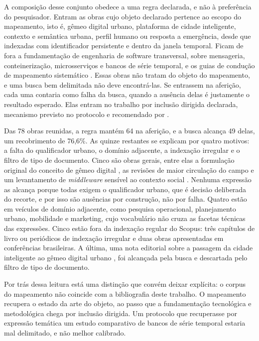 A composição desse conjunto obedece a uma regra declarada, e não à preferência do pesquisador. Entram as obras cujo objeto declarado pertence ao escopo do mapeamento, isto é, gêmeo digital urbano, plataforma de cidade inteligente, contexto e semântica urbana, perfil humano ou resposta a emergência, desde que indexadas com identificador persistente e dentro da janela temporal. Ficam de fora a fundamentação de engenharia de software transversal, sobre mensageria, conteinerização, microsserviços e bancos de série temporal, e os guias de condução de mapeamento sistemático \cite{petersen2015guidelines,barn2017conducting}. Essas obras não tratam do objeto do mapeamento, e uma busca bem delimitada não deve encontrá-las. Se entrassem na aferição, cada uma contaria como falha da busca, quando a ausência delas é justamente o resultado esperado. Elas entram no trabalho por inclusão dirigida declarada, mecanismo previsto no protocolo e recomendado por .

Das 78 obras reunidas, a regra mantém 64 na aferição, e a busca alcança 49 delas, um recobrimento de 76,6\%. As quinze restantes se explicam por quatro motivos: a falta do qualificador urbano, o domínio adjacente, a indexação irregular e o filtro de tipo de documento. Cinco são obras gerais, entre elas a formulação original do conceito de gêmeo digital \cite{grieves2016digital}, as revisões de maior circulação do campo \cite{barricelli2019survey,rasheed2020digital,vanderhorn2021digital} e um levantamento de \textit{middleware} sensível ao contexto social \cite{liang2015social}. Nenhuma expressão as alcança porque todas exigem o qualificador urbano, que é decisão deliberada do recorte, e por isso são ausências por construção, não por falha. Quatro estão em veículos de domínio adjacente, como pesquisa operacional, planejamento urbano, mobilidade e marketing, cujo vocabulário não cruza as facetas técnicas das expressões. Cinco estão fora da indexação regular do Scopus: três capítulos de livro ou periódicos de indexação irregular e duas obras apresentadas em conferências brasileiras. A última, uma nota editorial sobre a passagem da cidade inteligente ao gêmeo digital urbano \cite{yeh2024from}, foi alcançada pela busca e descartada pelo filtro de tipo de documento.

Por trás dessa leitura está uma distinção que convém deixar explícita: o corpus do mapeamento não coincide com a bibliografia deste trabalho. O mapeamento recupera o estado da arte do objeto, ao passo que a fundamentação tecnológica e metodológica chega por inclusão dirigida. Um protocolo que recuperasse por expressão temática um estudo comparativo de bancos de série temporal estaria mal delimitado, e não melhor calibrado.

